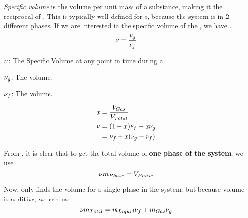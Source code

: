 \begin{definition}\label{def:Specific_Volume}
  \emph{Specific volume} is the volume per unit mass of a substance, making it the reciprocal of .
  This is typically well-defined for s, because the system is in 2 different phases.
  If we are interested in the specific volume of the , we have .
  \begin{equation}\label{eq:Specific_Volume}
    \nu = \frac{\nu_{g}}{\nu_{f}}
  \end{equation}

  \begin{description}[noitemsep]
  \item $\nu$: The Specific Volume at any point in time during a .
  \item $\nu_{g}$: The  volume.
  \item $\nu_{f}$: The  volume.
  \end{description}

  \begin{equation}\label{eq:Specific_Volume_Using_Quality}
    \begin{aligned}
      x &= \frac{V_{Gas}}{V_{Total}} \\
      \nu &= (1 - x) \nu_{f} + x \nu_{g} \\
      &= \nu_{f} + x (\nu_{g} - \nu_{f})
    \end{aligned}
  \end{equation}
\end{definition}

From , it is clear that to get the total volume of \textbf{one phase of the system}, we use 
\begin{equation}\label{eq:Single_Phase_Total_Volume}
  \nu m_{Phase} = V_{Phase}
\end{equation}

Now,  only finds the volume for a single phase in the system, but because volume is additive, we can use .
\begin{equation}\label{eq:Total_Volume}
  \nu m_{Total} = m_{Liquid} \nu_{f} + m_{Gas} \nu_{g}
\end{equation}

